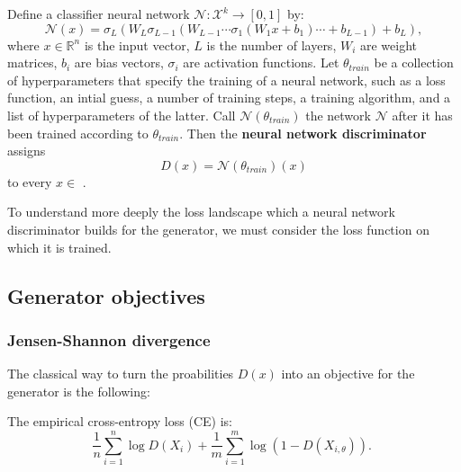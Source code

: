 \begin{definition}
    Define a classifier neural network $\mathcal{N}: \mathcal{X}^k \rightarrow [0, 1]$ by: %
    \begin{equation} 
        \mathcal{N}(x) = \sigma_L(W_L \sigma_{L-1}(W_{L-1} \cdots \sigma_1(W_1 x + b_1) \cdots + b_{L-1}) + b_L),
    \end{equation}
    where $x \in \mathbb{R}^n$ is the input vector, $L$ is the number of layers, $W_i$ are weight matrices, $b_i$ are bias vectors, $\sigma_i$ are activation functions. %
    Let $\theta_{train}$ be a collection of hyperparameters that specify the training of a neural network, such as a loss function, an intial guess, a number of training steps, a training algorithm, and a list of hyperparameters of the latter. %
    Call $\mathcal{N}(\theta_{train})$ the network $\mathcal{N}$ after it has been trained according to $\theta_{train}$.
    Then the \textbf{neural network discriminator} assigns
    \begin{equation}
        D(x) = \mathcal{N}(\theta_{train})(x)
    \end{equation}
    to every $x \in$ . %
\end{definition}

To understand more deeply the loss landscape which a neural network discriminator builds for the generator, we must consider the loss function on which it is trained.

\subsection{Generator objectives}
\label{sec:losses}

\subsubsection{Jensen-Shannon divergence}
\label{sec:ce_loss}

The classical way to turn the proabilities $D(x)$ into an objective for the generator is the following: 

\begin{definition}[Cross-entropy loss] %
    The empirical cross-entropy loss (CE) is:
    $$
    \frac{1}{n} \sum_{i=1}^n \log D\left(X_i\right)+\frac{1}{m} \sum_{i=1}^m \log \left(1-D\left(X_{i, \theta}\right)\right) \text {. }
    $$    
\end{definition}

